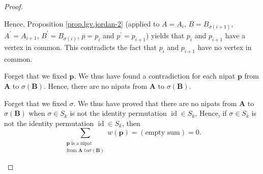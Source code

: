 \begin{proof}
\begin{fineprint}
Hence, Proposition \ref{prop.lgv.jordan-2} (applied to $A=A_{i}$,
$B=B_{\sigma\left(  i+1\right)  }$, $A^{\prime}=A_{i+1}$, $B^{\prime
}=B_{\sigma\left(  i\right)  }$, $p=p_{i}$ and $p^{\prime}=p_{i+1}$) yields
that $p_{i}$ and $p_{i+1}$ have a vertex in common. This contradicts the fact
that $p_{i}$ and $p_{i+1}$ have no vertex in common.

Forget that we fixed $\mathbf{p}$. We thus have found a contradiction for each
nipat $\mathbf{p}$ from $\mathbf{A}$ to $\sigma\left(  \mathbf{B}\right)  $.
Hence, there are no nipats from $\mathbf{A}$ to $\sigma\left(  \mathbf{B}%
\right)  $.

Forget that we fixed $\sigma$. We thus have proved that there are no nipats
from $\mathbf{A}$ to $\sigma\left(  \mathbf{B}\right)  $ when $\sigma\in
S_{k}$ is not the identity permutation $\operatorname*{id}\in S_{k}$. Hence,
if $\sigma\in S_{k}$ is not the identity permutation $\operatorname*{id}\in
S_{k}$, then%
\begin{equation}
\sum_{\substack{\mathbf{p}\text{ is a nipat}\\\text{from }\mathbf{A}\text{ to
}\sigma\left(  \mathbf{B}\right)  }}w\left(  \mathbf{p}\right)  =\left(
\text{empty sum}\right)  =0. \label{pf.cor.lgv.kpaths.wt-np.at}%
\end{equation}



\end{fineprint}
\end{proof}

